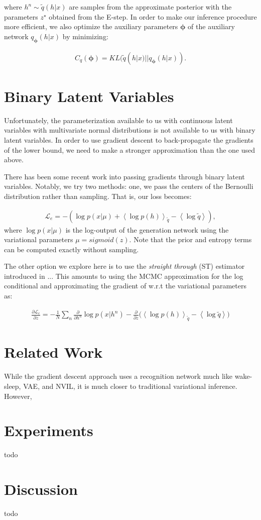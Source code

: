 \documentclass{article}
\newcommand{\qexp}[1]{\left<#1\right>}
\newcommand{\vects}[1]{\boldsymbol{#1}}
\newcommand{\PP}[0]{\vects{\phi}}
\newcommand{\LL}[0]{\mathcal{L}}
\begin{document}
where $h^n \sim \tilde{q}(h|x)$ are samples from the approximate posterior with the parameters $z^{\star}$ obtained from the E-step. In order to make our inference procedure more efficient, we also optimize the auxiliary parameters $\PP$ of the auxiliary network $q_{\PP}(h|x)$ by minimizing:

\begin{align}
    \label{eq:c_q}
    C_q(\PP) = KL(\tilde{q}(h|x)||q_{\PP}(h|x)).
\end{align}

\section{Binary Latent Variables}
Unfortunately, the parameterization available to us with continuous latent variables with multivariate normal distributions is not available to us with binary latent variables. In order to use gradient descent to back-propagate the gradients of the lower bound, we need to make a stronger approximation than the one used above. 

There has been some recent work into passing gradients through binary latent variables. Notably, we try two methods: one, we pass the centers of the Bernoulli distribution rather than sampling. That is, our loss becomes:

\begin{align}
	 \LL_e = -(\log p(x | \mu) + \qexp{\log p(h)}_{\tilde{q}} - \qexp{\log \tilde{q}}),
\end{align}
where $\log p(x | \mu)$ is the log-output of the generation network using the variational parameters $\mu = sigmoid(z)$. Note that the prior and entropy terms can be computed exactly without sampling.

The other option we explore here is to use the \emph{straight through} (ST) estimator introduced in ... This amounts to using the MCMC approximation for the log conditional and approximating the gradient of w.r.t the variational parameters as:

\begin{align}
	\frac{\partial \LL_e}{\partial z} =  -\frac{1}{N} \sum_n \frac{\partial}{\partial h^n} \log p(x|h^n) - \frac{\partial}{\partial z} \big( \qexp{\log p(h)}_{\tilde{q}} - \qexp{\log \tilde{q}} \big)
\end{align}

\section{Related Work}
While the gradient descent approach uses a recognition network much like wake-sleep, VAE, and NVIL, it is much closer to traditional variational inference. However, 

\section{Experiments}
todo
\section{Discussion}
todo
\end{document}
